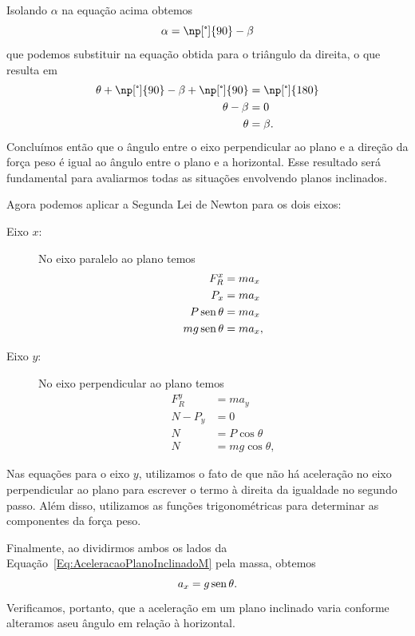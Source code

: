 Isolando $\alpha$ na equação acima obtemos
\begin{equation}
    \alpha = \np[\tcdegree]{90} - \beta
\end{equation}
%
que podemos substituir na equação obtida para o triângulo da direita, o que resulta em
\begin{align}
        \theta + \np[\tcdegree]{90} - \beta + \np[\tcdegree]{90} &= \np[\tcdegree]{180} \\
        \theta - \beta &= 0 \\
        \theta &= \beta.
\end{align}
%
Concluímos então que o ângulo entre o eixo perpendicular ao plano e a direção da força peso é igual ao ângulo entre o plano e a horizontal. Esse resultado será fundamental para avaliarmos todas as situações envolvendo planos inclinados.


Agora podemos aplicar a Segunda Lei de Newton para os dois eixos:
\begin{description}
    \item[Eixo $x$:] No eixo paralelo ao plano temos
        \begin{align}
            F_R^x &= m a_x \\
            P_x &= m a_x \\
            P \operatorname{sen}\theta &= m a_x \\
            mg \operatorname{sen}\theta &= ma_x,\label{Eq:AceleracaoPlanoInclinadoM}
        \end{align}
    \item[Eixo $y$:] No eixo perpendicular ao plano temos
        \begin{align}
            F_R^y &= m a_y \\
            N - P_y &= 0 \\
            N &= P \cos\theta \\
            N &= mg \cos\theta,
        \end{align}
\end{description}
%
Nas equações para o eixo $y$, utilizamos o fato de que não há aceleração no eixo perpendicular ao plano para escrever o termo à direita da igualdade no segundo passo. Além disso, utilizamos as funções trigonométricas para determinar as componentes da força peso.

Finalmente, ao dividirmos ambos os lados da Equação~\ref{Eq:AceleracaoPlanoInclinadoM} pela massa, obtemos
\begin{equation}
    a_x = g \operatorname{sen}\theta.
\end{equation}
%
Verificamos, portanto, que a aceleração em um plano inclinado varia conforme alteramos aseu ângulo em relação à horizontal.

